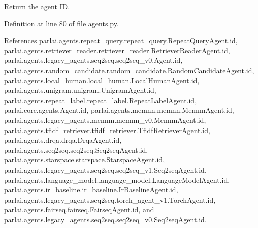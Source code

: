 \begin{DoxyVerb}Return the agent ID.\end{DoxyVerb}
 

Definition at line 80 of file agents.\+py.



References parlai.\+agents.\+repeat\+\_\+query.\+repeat\+\_\+query.\+Repeat\+Query\+Agent.\+id, parlai.\+agents.\+retriever\+\_\+reader.\+retriever\+\_\+reader.\+Retriever\+Reader\+Agent.\+id, parlai.\+agents.\+legacy\+\_\+agents.\+seq2seq.\+seq2seq\+\_\+v0.\+Agent.\+id, parlai.\+agents.\+random\+\_\+candidate.\+random\+\_\+candidate.\+Random\+Candidate\+Agent.\+id, parlai.\+agents.\+local\+\_\+human.\+local\+\_\+human.\+Local\+Human\+Agent.\+id, parlai.\+agents.\+unigram.\+unigram.\+Unigram\+Agent.\+id, parlai.\+agents.\+repeat\+\_\+label.\+repeat\+\_\+label.\+Repeat\+Label\+Agent.\+id, parlai.\+core.\+agents.\+Agent.\+id, parlai.\+agents.\+memnn.\+memnn.\+Memnn\+Agent.\+id, parlai.\+agents.\+legacy\+\_\+agents.\+memnn.\+memnn\+\_\+v0.\+Memnn\+Agent.\+id, parlai.\+agents.\+tfidf\+\_\+retriever.\+tfidf\+\_\+retriever.\+Tfidf\+Retriever\+Agent.\+id, parlai.\+agents.\+drqa.\+drqa.\+Drqa\+Agent.\+id, parlai.\+agents.\+seq2seq.\+seq2seq.\+Seq2seq\+Agent.\+id, parlai.\+agents.\+starspace.\+starspace.\+Starspace\+Agent.\+id, parlai.\+agents.\+legacy\+\_\+agents.\+seq2seq.\+seq2seq\+\_\+v1.\+Seq2seq\+Agent.\+id, parlai.\+agents.\+language\+\_\+model.\+language\+\_\+model.\+Language\+Model\+Agent.\+id, parlai.\+agents.\+ir\+\_\+baseline.\+ir\+\_\+baseline.\+Ir\+Baseline\+Agent.\+id, parlai.\+agents.\+legacy\+\_\+agents.\+seq2seq.\+torch\+\_\+agent\+\_\+v1.\+Torch\+Agent.\+id, parlai.\+agents.\+fairseq.\+fairseq.\+Fairseq\+Agent.\+id, and parlai.\+agents.\+legacy\+\_\+agents.\+seq2seq.\+seq2seq\+\_\+v0.\+Seq2seq\+Agent.\+id.



